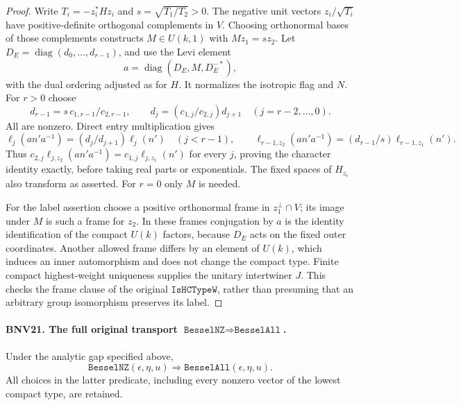 \begin{proof}
Write $T_i=-z_i^*Hz_i$ and $s=\sqrt{T_1/T_2}>0$.
The negative unit vectors $z_i/\sqrt{T_i}$ have positive-definite
orthogonal complements in $V$.  Choosing orthonormal bases of those
complements constructs $M\in U(k,1)$ with $Mz_1=sz_2$.
Let $D_E=\operatorname{diag}(d_0,\ldots,d_{r-1})$, and use the Levi
element
\[
 a=\operatorname{diag}(D_E,M,D_E^{-*}),
\]
with the dual ordering adjusted as for $H$.  It normalizes the isotropic
flag and $N$.  For $r>0$ choose
\[
 d_{r-1}=s\,c_{1,r-1}/c_{2,r-1},\qquad
 d_j=(c_{1,j}/c_{2,j})d_{j+1}\quad(j=r-2,\ldots,0).
\]
All are nonzero.  Direct entry multiplication gives
\[
 \ell_j(an'a^{-1})=(d_j/d_{j+1})\ell_j(n')\quad(j<r-1),
 \qquad
 \ell_{r-1,z_2}(an'a^{-1})=(d_{r-1}/s)\ell_{r-1,z_1}(n').
\]
Thus $c_{2,j}\ell_{j,z_2}(an'a^{-1})=c_{1,j}\ell_{j,z_1}(n')$
for every $j$, proving the character identity exactly, before taking
real parts or exponentials.  The fixed spaces of $H_{z_i}$ also
transform as asserted.  For $r=0$ only $M$ is needed.

For the label assertion choose a positive orthonormal frame in
$z_1^\perp\cap V$; its image under $M$ is such a frame for $z_2$.
In these frames conjugation by $a$ is the identity identification of
the compact $U(k)$ factors, because $D_E$ acts on the fixed outer
coordinates.  Another allowed frame differs by an element of $U(k)$,
which induces an inner automorphism and does not change the compact
type.  Finite compact highest-weight uniqueness supplies the unitary
intertwiner $J$.  This checks the frame clause of the original
$\texttt{IsHCTypeW}$, rather than presuming that an arbitrary group
isomorphism preserves its label.
\end{proof}

\paragraph{BNV21. The full original transport $\texttt{BesselNZ}\Rightarrow\texttt{BesselAll}$.}
\label{claim:BNV21}
Under the analytic gap specified above,
\[
 \texttt{BesselNZ}(\epsilon,\eta,u)
       \Longrightarrow\texttt{BesselAll}(\epsilon,\eta,u).
 \tag{BNV.37}
\]
All choices in the latter predicate, including every nonzero vector of
the lowest compact type, are retained.

